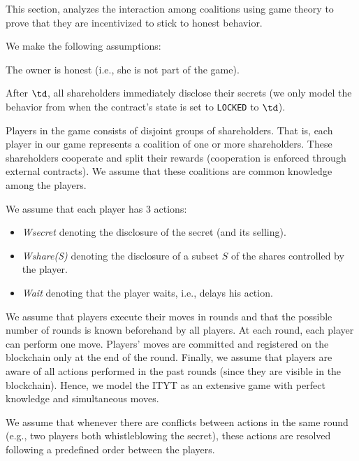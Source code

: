 This section, analyzes the interaction among coalitions using game theory to prove that they are incentivized to stick to honest behavior.

%
We make the following assumptions:
\begin{compactenum} 
\item The owner is honest (i.e., she is not part of the game).

\item After $\td$, all shareholders immediately disclose their secrets (we only model the behavior from when the contract's state is set to \texttt{LOCKED} to $\td$).

\item Players in the game consists of disjoint groups of shareholders.
%
That is, each player in our game represents a coalition of one or more shareholders.
%
These shareholders cooperate and split their rewards (cooperation is enforced through external contracts).
%
We assume that these coalitions are common knowledge among the players.

\item We assume that each player has 3 actions: 
\begin{itemize}
\item \textit{Wsecret} denoting the disclosure of the secret (and its selling).
\item \textit{Wshare(S)} denoting the disclosure of a subset $S$ of the shares controlled by the player.
\item \textit{Wait} denoting that the player waits, i.e., delays his action.
\end{itemize}

\item We assume that players execute their moves in rounds and that the possible number of rounds is known beforehand by all players.
%
At each round, each player can perform one move. 
%
Players' moves are committed and registered on the blockchain only at the end of the round.
%
Finally, we assume that players are aware of all actions performed in the past rounds (since they are visible in the blockchain).
%
Hence, we model the ITYT as an extensive game with perfect knowledge and simultaneous moves. 

\item We assume that whenever there are conflicts between actions in the same round (e.g., two players both whistleblowing the secret), these actions are resolved following a predefined order between the players.

\end{compactenum}

